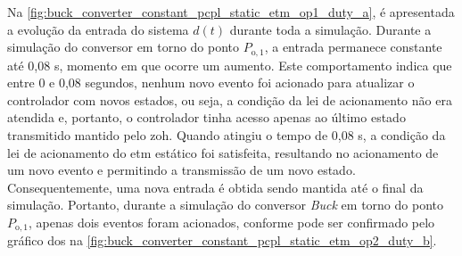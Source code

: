 Na \autoref{fig:buck_converter_constant_pcpl_static_etm_op1_duty_a}, é apresentada a evolução da entrada do sistema $d(t)$ durante toda a simulação. Durante a simulação do conversor em torno do ponto $P_{\mathrm{o}, 1}$, a entrada permanece constante até 0,08 s, momento em que ocorre um aumento. Este comportamento indica que entre 0 e 0,08 segundos, nenhum novo evento foi acionado para atualizar o controlador com novos estados, ou seja, a condição da lei de acionamento não era atendida e, portanto, o controlador tinha acesso apenas ao último estado transmitido mantido pelo \acrshort{zoh}. Quando atingiu o tempo de 0,08 s, a condição da lei de acionamento do \acrshort{etm} estático foi satisfeita, resultando no acionamento de um novo evento e permitindo a transmissão de um novo estado. Consequentemente, uma nova entrada é obtida sendo mantida até o final da simulação. Portanto, durante a simulação do conversor \textit{Buck} em torno do ponto $P_{\mathrm{o}, 1}$, apenas dois eventos foram acionados, conforme pode ser confirmado pelo gráfico dos  na \autoref{fig:buck_converter_constant_pcpl_static_etm_op2_duty_b}.

